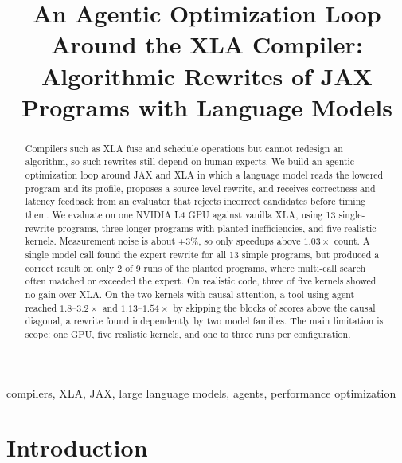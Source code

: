 \documentclass[conference]{IEEEtran}
\begin{document}
\title{An Agentic Optimization Loop Around the XLA Compiler:\\
Algorithmic Rewrites of JAX Programs with Language Models}

\author{
}

\maketitle

\begin{abstract}
Compilers such as XLA fuse and schedule operations but cannot redesign an
algorithm, so such rewrites still depend on human experts. We build an
agentic optimization loop around JAX and XLA in which a language model reads
the lowered program and its profile, proposes a source-level rewrite, and
receives correctness and latency feedback from an evaluator that rejects
incorrect candidates before timing them. We evaluate on one NVIDIA L4 GPU
against vanilla XLA, using 13 single-rewrite programs, three longer programs
with planted inefficiencies, and five realistic kernels. Measurement noise
is about $\pm3\%$, so only speedups above $1.03\times$ count. A single model
call found the expert rewrite for all 13 simple programs, but produced a
correct result on only 2 of 9 runs of the planted programs, where multi-call
search often matched or exceeded the expert. On realistic code, three of
five kernels showed no gain over XLA. On the two kernels with causal
attention, a tool-using agent reached $1.8$--$3.2\times$ and
$1.13$--$1.54\times$ by skipping the blocks of scores above the causal
diagonal, a rewrite found independently by two model families. The main limitation is
scope: one GPU, five realistic kernels, and one to three runs per
configuration.
\end{abstract}

\begin{IEEEkeywords}
compilers, XLA, JAX, large language models, agents, performance optimization
\end{IEEEkeywords}

\section{Introduction}
\end{document}
